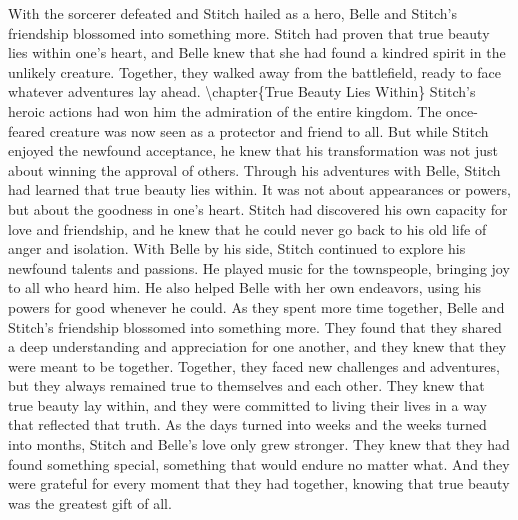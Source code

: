 \documentclass{book}%
\begin{document}
\newline%
With the sorcerer defeated and Stitch hailed as a hero, Belle and Stitch's friendship blossomed into something more. Stitch had proven that true beauty lies within one's heart, and Belle knew that she had found a kindred spirit in the unlikely creature. Together, they walked away from the battlefield, ready to face whatever adventures lay ahead.%
\textbackslash{}chapter\{True Beauty Lies Within\}\newline%
\newline%
Stitch's heroic actions had won him the admiration of the entire kingdom. The once{-}feared creature was now seen as a protector and friend to all. But while Stitch enjoyed the newfound acceptance, he knew that his transformation was not just about winning the approval of others.\newline%
\newline%
Through his adventures with Belle, Stitch had learned that true beauty lies within. It was not about appearances or powers, but about the goodness in one's heart. Stitch had discovered his own capacity for love and friendship, and he knew that he could never go back to his old life of anger and isolation.\newline%
\newline%
With Belle by his side, Stitch continued to explore his newfound talents and passions. He played music for the townspeople, bringing joy to all who heard him. He also helped Belle with her own endeavors, using his powers for good whenever he could.\newline%
\newline%
As they spent more time together, Belle and Stitch's friendship blossomed into something more. They found that they shared a deep understanding and appreciation for one another, and they knew that they were meant to be together.\newline%
\newline%
Together, they faced new challenges and adventures, but they always remained true to themselves and each other. They knew that true beauty lay within, and they were committed to living their lives in a way that reflected that truth.\newline%
\newline%
As the days turned into weeks and the weeks turned into months, Stitch and Belle's love only grew stronger. They knew that they had found something special, something that would endure no matter what. And they were grateful for every moment that they had together, knowing that true beauty was the greatest gift of all.%
\end{document}
